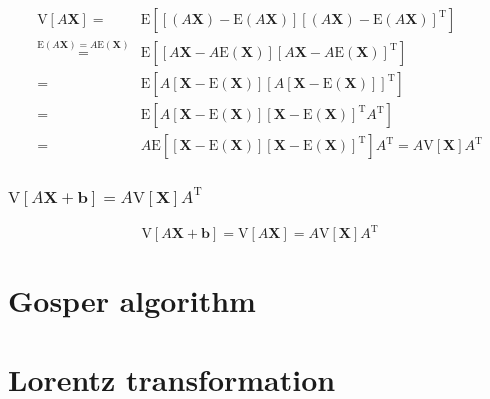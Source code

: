 \documentclass[
]{book}
\theoremstyle{definition}
\theoremstyle{definition}
\theoremstyle{definition}
\theoremstyle{definition}
\theoremstyle{remark}
\begin{document}
\begin{align*}
\mathrm{V}\left[A\boldsymbol{X}\right]= & \mathrm{E}\left[\left[\left(A\boldsymbol{X}\right)-\mathrm{E}\left(A\boldsymbol{X}\right)\right]\left[\left(A\boldsymbol{X}\right)-\mathrm{E}\left(A\boldsymbol{X}\right)\right]^{\mathrm{T}}\right]\\
\overset{\mathrm{E}\left(A\boldsymbol{X}\right)=A\mathrm{E}\left(\boldsymbol{X}\right)}{=} & \mathrm{E}\left[\left[A\boldsymbol{X}-A\mathrm{E}\left(\boldsymbol{X}\right)\right]\left[A\boldsymbol{X}-A\mathrm{E}\left(\boldsymbol{X}\right)\right]^{\mathrm{T}}\right]\\
= & \mathrm{E}\left[A\left[\boldsymbol{X}-\mathrm{E}\left(\boldsymbol{X}\right)\right]\left[A\left[\boldsymbol{X}-\mathrm{E}\left(\boldsymbol{X}\right)\right]\right]^{\mathrm{T}}\right]\\
= & \mathrm{E}\left[A\left[\boldsymbol{X}-\mathrm{E}\left(\boldsymbol{X}\right)\right]\left[\boldsymbol{X}-\mathrm{E}\left(\boldsymbol{X}\right)\right]^{\mathrm{T}}A^{\mathrm{T}}\right]\\
= & A\mathrm{E}\left[\left[\boldsymbol{X}-\mathrm{E}\left(\boldsymbol{X}\right)\right]\left[\boldsymbol{X}-\mathrm{E}\left(\boldsymbol{X}\right)\right]^{\mathrm{T}}\right]A^{\mathrm{T}}=A\mathrm{V}\left[\boldsymbol{X}\right]A^{\mathrm{T}}
\end{align*}

\subsection{\texorpdfstring{\(\mathrm{V}\left[A\boldsymbol{X}+\boldsymbol{b}\right]=A\mathrm{V}\left[\boldsymbol{X}\right]A^{\mathrm{T}}\)}{\textbackslash mathrm\{V\}\textbackslash left{[}A\textbackslash boldsymbol\{X\}+\textbackslash boldsymbol\{b\}\textbackslash right{]}=A\textbackslash mathrm\{V\}\textbackslash left{[}\textbackslash boldsymbol\{X\}\textbackslash right{]}A\^{}\{\textbackslash mathrm\{T\}\}}}\label{mathrmvleftaboldsymbolxboldsymbolbrightamathrmvleftboldsymbolxrightamathrmt}

\[
\mathrm{V}\left[A\boldsymbol{X}+\boldsymbol{b}\right]=\mathrm{V}\left[A\boldsymbol{X}\right]=A\mathrm{V}\left[\boldsymbol{X}\right]A^{\mathrm{T}}
\]

\chapter{Gosper algorithm}\label{gosper-algorithm}

\chapter{Lorentz transformation}\label{lorentz-transformation}
\end{document}
